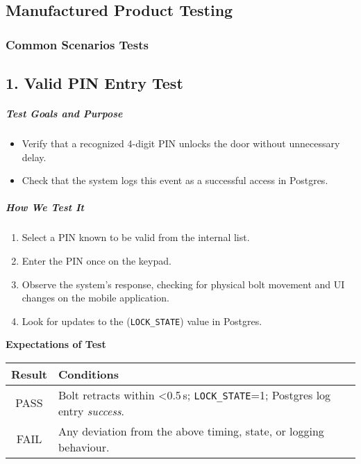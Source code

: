 \newpage
\begin{samepage}
    \subsection{Manufactured Product Testing}
    \subsubsection{Common Scenarios Tests}
    \subsection*{1. Valid PIN Entry Test}
    \subparagraph{Test Goals and Purpose}
    \begin{itemize}
        \item Verify that a recognized 4-digit PIN unlocks the door without unnecessary delay.
        \item Check that the system logs this event as a successful access in Postgres.
    \end{itemize}
    \subparagraph{How We Test It}
    \begin{enumerate}
        \item Select a PIN known to be valid from the internal list.
        \item Enter the PIN once on the keypad.
        \item Observe the system's response, checking for physical bolt movement and UI changes on the mobile application.
        \item Look for updates to the (\texttt{LOCK\_STATE}) value in Postgres.
    \end{enumerate}
    
    \textbf{Expectations of Test}
    \begin{center}
    \begin{tabular}{|c|p{10cm}|}
      \hline
      \textbf{Result} & \textbf{Conditions} \\
      \hline
      PASS & Bolt retracts within \textless{}0.5\,s; \texttt{LOCK\_STATE}=1; Postgres log entry \emph{success}. \\
      \hline
      FAIL & Any deviation from the above timing, state, or logging behaviour. \\
      \hline
    \end{tabular}
    \end{center}
\end{samepage}


